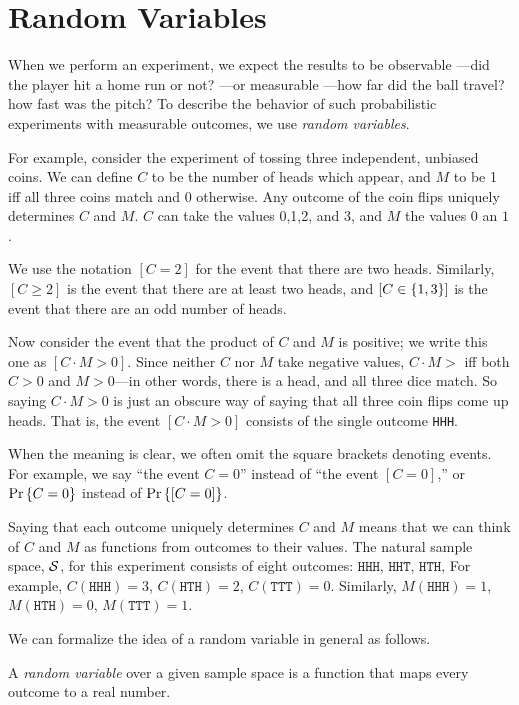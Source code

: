 \documentclass[11pt,twoside]{article}
\begin{document}

\section{Random Variables}
 
When we perform an experiment, we expect the results to be observable
---did the player hit a home run or not? ---or measurable ---how far did
the ball travel? how fast was the pitch?  To describe the behavior of such
probabilistic experiments with measurable outcomes, we use \emph{random
  variables}.

For example, consider the experiment of tossing three independent,
unbiased coins.  We can define $C$ to be the number of heads which appear,
and $M$ to be 1 iff all three coins match and 0 otherwise.  Any outcome of
the coin flips uniquely determines $C$ and $M$.  $C$ can take the values
0,1,2, and 3, and $M$ the values $0$ an $1$.

We use the notation $[C = 2]$ for the event that there are two heads.
Similarly, $[C \geq 2]$ is the event that there are at least two heads,
and $[C \in \left\{1, 3\right\}]$ is the event that there are an odd number of
heads.

Now consider the event that the product of $C$ and $M$ is positive; we
write this one as $[C \cdot M >0]$.  Since neither $C$ nor $M$ take
negative values, $C\cdot M>$ iff both $C>0$ and $M>0$---in other words,
there is a head, and all three dice match.  So saying $C \cdot M >0$ is
just an obscure way of saying that all three coin flips come up heads.
That is, the event $[C \cdot M >0]$ consists of the single outcome
\texttt{HHH}.

When the meaning is clear, we often omit the square brackets denoting
events.  For example, we say ``the event $C=0$'' instead of ``the event
$[C=0]$,'' or $\mathop{\textup{Pr}}\nolimits\left\{C=0\right\}$ instead of $\mathop{\textup{Pr}}\nolimits\left\{[C=0]\right\}$.

Saying that each outcome uniquely determines $C$ and $M$ means that we can
think of $C$ and $M$ as functions from outcomes to their values.  The
natural sample space, $\mathcal{S}$, for this experiment consists of eight
outcomes: $\mathtt{HHH}$, $\mathtt{HHT}$, $\mathtt{HTH}$, \etc  For
example, $C(\mathtt{HHH}) = 3$, $C(\mathtt{HTH}) = 2$, $C(\mathtt{TTT}) =
0$.  Similarly, $M(\mathtt{HHH}) = 1$, $M(\mathtt{HTH}) = 0$,
$M(\mathtt{TTT}) = 1$.

We can formalize the idea of a random variable in general as follows.
\begin{definition}
A \emph{random variable} over a given sample space is a function that maps
every outcome to a real number.
\end{definition}
\end{document}
